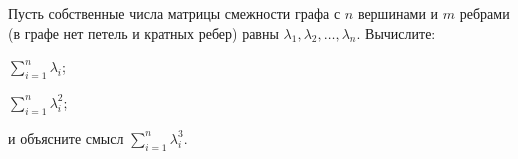 Пусть собственные числа матрицы смежности графа с $n$ вершинами и $m$ ребрами (в графе нет петель и кратных ребер) равны
$\lambda_1, \lambda_2, \dots, \lambda_n$. Вычислите:
\begin{enumcyr}
    \item $\sum\limits_{i = 1}^n \lambda_i$;
    \item $\sum\limits_{i = 1}^n \lambda_i^2$;
    \item и объясните смысл $\sum\limits_{i = 1}^n \lambda_i^3$.
\end{enumcyr}